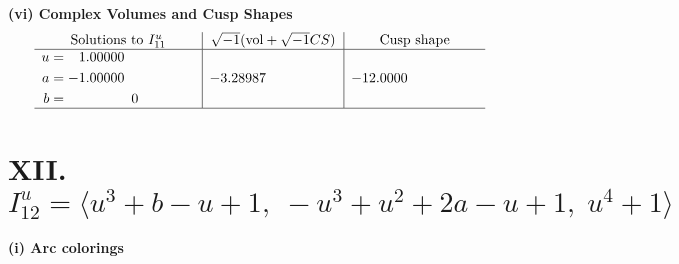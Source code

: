 \documentclass[1p]{elsarticle_modified}
\theoremstyle{definition}
\newcommand{\I}{\sqrt{-1}}
\begin{document}
\newpage\flushleft \textbf{(vi) Complex Volumes and Cusp Shapes}
$$\begin{array}{c|c|c}  
\text{Solutions to }I^u_{11}& \I (\text{vol} + \sqrt{-1}CS) & \text{Cusp shape}\\
 \hline 
\begin{aligned}
u &= \phantom{-}1.00000\phantom{ +0.000000I} \\
a &= -1.00000\phantom{ +0.000000I} \\
b &= \phantom{-0.000000 } 0\end{aligned}
 & -3.28987\phantom{ +0.000000I} & -12.0000\phantom{ +0.000000I}\\
 \hline 
 \end{array}$$\newpage\newpage\renewcommand{\arraystretch}{1}
\centering \section*{XII. $I^u_{12}= \langle u^3+b- u+1,\;- u^3+u^2+2 a- u+1,\;u^4+1 \rangle$}
\flushleft \textbf{(i) Arc colorings}\\
\end{document}
